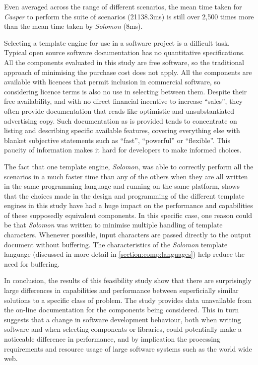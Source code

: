 Even averaged across the range of different scenarios, the mean time taken for \emph{Casper} to perform the suite of scenarios (21138.3ms) is still over 2,500 times more than the mean time taken by \emph{Solomon} (8ms).

Selecting a \gls{template engine} for use in a software project is a difficult task. Typical open source software documentation has no quantitative specifications. All the components evaluated in this study are free software, so the traditional approach of minimising the purchase cost does not apply. All the components are available with licences that permit inclusion in commercial software, so considering licence terms is also no use in selecting between them. Despite their free availability, and with no direct financial incentive to increase \enquote{sales}, they often provide documentation that reads like optimistic and unsubstantiated advertising copy. Such documentation as is provided tends to concentrate on listing and describing specific available features, covering everything else with blanket subjective statements such as \enquote{fast}, \enquote{powerful} or \enquote{flexible}. This paucity of information makes it hard for developers to make informed choices.

The fact that one \gls{template engine}, \emph{Solomon}, was able to correctly perform all the scenarios in a much faster time than any of the others when they are all written in the same \gls{programming language} and running on the same platform, shows that the choices made in the design and programming of the different \gls{template engine}s in this study have had a huge impact on the performance and capabilities of these supposedly equivalent components. In this specific case, one reason could be that \emph{Solomon} was written to minimise multiple handling of template characters. Whenever possible, input characters are passed directly to the output document without buffering. The characteristics of the \emph{Solomon} \gls{template language} (discussed in more detail in \autoref{section:comp:languages}) help reduce the need for buffering.

\label{A139}
In conclusion, the results of this feasibility study show that there are surprisingly large differences in capabilities and performance between superficially similar solutions to a specific class of problem. The study provides data unavailable from the on-line documentation for the components being considered. This in turn suggests that a change in software development behaviour, both when writing software and when selecting components or libraries, could potentially make a noticeable difference in performance, and by implication the processing requirements and resource usage of large software systems such as the world wide web.

